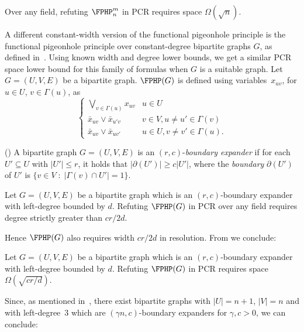 \begin{corollary} \label{cor:FPHP_space}
Over any field, refuting $\FPHP^m_n$ in PCR requires space $\Omega(\sqrt{n})$.
\end{corollary}

A different constant-width version of the functional pigeonhole principle is the functional pigeonhole principle over 
constant-degree bipartite graphs $G$, as defined in~\cite{DBLP:conf/coco/MiksaN15}. Using known width and degree lower bounds, we  get a similar PCR space lower bound for this family of formulas when $G$ is a suitable graph. 
Let $G=(U,V,E)$ be a bipartite graph. $\FPHP(G)$ is defined using variables~$x_{uv}$,  for $u\in U$, $v \in \Gamma(u)$,
as 
 $$
\left \{
\begin{array}{ll}
\bigvee_{v\in\Gamma(u)}x_{uv}  & u \in U   \\
\bar x_{uv} \vee \bar x_{u'v}  & v\in V,u \not = u' \in \Gamma(v) \\
\bar x_{uv} \vee \bar x_{uv'}&  u \in U,  v \not = v'\in \Gamma(u).
\end{array}
\right.
$$

%
%
\begin{definition} (\cite[Definition 3.1]{DBLP:conf/coco/MiksaN15}) 
%
A bipartite graph $G=(U,V,E)$ is an $(r,c)$-\emph{boundary expander} if for each 
$U'\subseteq U$ with $|U'|\leq r$, it holds that $|\partial(U')| \geq c |U'|$,
where the \emph{boundary} $\partial(U')$ of $U'$ is $\{v \in V \; : \; |\Gamma(v) \cap U'|=1\}$.
\end{definition}

%
%
%
%
\begin{theorem}
%
Let $G=(U,V,E)$  be a bipartite graph which is an $(r,c)$-boundary expander
with left-degree bounded by $d$. 
Refuting $\FPHP(G)$ in PCR over any field requires degree strictly
greater than $cr /2d$.
\end{theorem}

Hence $\FPHP(G)$ also requires width  $cr/2d$ in resolution. From   
we conclude:

\begin{theorem}
Let $G=(U,V,E)$ be a bipartite graph which is an $(r,c)$-boundary expander
with left-degree bounded by $d$.   
Refuting $\FPHP(G)$ in PCR requires space $\Omega(\sqrt{{c r}/{d}})$.
\end{theorem}

Since, as mentioned in~\cite{DBLP:conf/coco/MiksaN15}, 
there exist bipartite graphs with $|U| = n+1$, $|V| = n$ and with left-degree~3 
which are $(\gamma n, c)$-boundary expanders for $\gamma, c > 0$, we can conclude:


